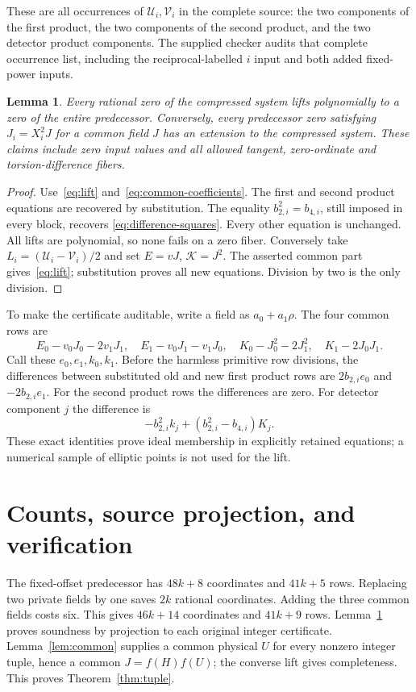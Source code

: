 \documentclass[11pt]{article}
\newtheorem{lemma}[theorem]{Lemma}
\begin{document}
These are all occurrences of $\mathcal U_i,\mathcal V_i$ in the complete
source: the two components of the first product, the two components
of the second product, and the two detector product components.
The supplied checker audits that complete occurrence list, including
the reciprocal-labelled $i$ input and both added fixed-power inputs.

\begin{lemma}\label{lem:lift}
Every rational zero of the compressed system lifts polynomially to a
zero of the entire predecessor. Conversely, every predecessor zero
satisfying $J_i=X_i^2J$ for a common field $J$ has an extension to the
compressed system. These claims include zero input values and all
allowed tangent, zero-ordinate and torsion-difference fibers.
\end{lemma}
\begin{proof}
Use~\eqref{eq:lift} and~\eqref{eq:common-coefficients}. The first and
second product equations are recovered by substitution.
The equality $b_{2,i}^2=b_{4,i}$, still imposed in every block, recovers
\eqref{eq:difference-squares}. Every other equation is unchanged.
All lifts are polynomial, so none fails on a zero fiber. Conversely
take $L_i=(\mathcal U_i-\mathcal V_i)/2$ and set $E=vJ$, $\mathcal K=J^2$.
The asserted common part gives~\eqref{eq:lift}; substitution proves
all new equations. Division by two is the only division.
\end{proof}

To make the certificate auditable, write a field as $a_0+a_1\rho$.
The four common rows are
\[
 E_0-v_0J_0-2v_1J_1,\quad E_1-v_0J_1-v_1J_0,\quad
 K_0-J_0^2-2J_1^2,\quad K_1-2J_0J_1.
\]
Call these $e_0,e_1,k_0,k_1$. Before the harmless primitive row
divisions, the differences between substituted old and new first
product rows are $2b_{2,i}e_0$ and $-2b_{2,i}e_1$.
For the second product rows the differences are zero.
For detector component $j$ the difference is
\[
            -b_{2,i}^2 k_j+(b_{2,i}^2-b_{4,i})K_j.
\]
These exact identities prove ideal membership in explicitly retained
equations; a numerical sample of elliptic points is not used for the lift.

\section{Counts, source projection, and verification}

The fixed-offset predecessor has $48k+8$ coordinates and $41k+5$
rows. Replacing two private fields by one saves $2k$ rational
coordinates. Adding the three common fields costs six. This gives
$46k+14$ coordinates and $41k+9$ rows. Lemma~\ref{lem:lift} proves
soundness by projection to each original integer certificate.
Lemma~\ref{lem:common} supplies a common physical $U$ for every nonzero
integer tuple, hence a common $J=f(H)f(U)$; the converse lift gives
completeness. This proves Theorem~\ref{thm:tuple}.
\end{document}
